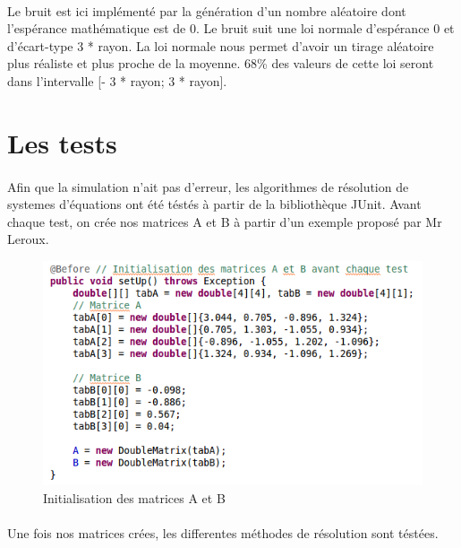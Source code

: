 \documentclass[a4paper,11pt]{article}
\begin{document}
		\paragraph{}
		Le bruit est ici implémenté par la génération d'un nombre aléatoire dont l’espérance mathématique est de 0. Le bruit suit une loi normale d'espérance 0 et d'écart-type 3 * rayon. La loi normale nous permet d'avoir un tirage aléatoire plus réaliste et plus proche de la moyenne. 68\% des valeurs de cette loi seront dans l'intervalle [- 3 * rayon; 3 * rayon].  
		

		\newpage

		\section{Les tests}
		\paragraph{}
		Afin que la simulation n'ait pas d'erreur, les algorithmes de résolution de systemes d'équations ont été téstés à partir de la bibliothèque JUnit.
		Avant chaque test, on crée nos matrices A et B à partir d'un exemple proposé par Mr Leroux.

		\begin{figure}[h]
			\centerline{\includegraphics[scale=0.50]{img/testInit.png}}
			\caption{Initialisation des matrices A et B}
			\label{diagramme-composants}
		\end{figure} 

		\paragraph{}
		Une fois nos matrices crées, les differentes méthodes de résolution sont téstées.
\end{document}
